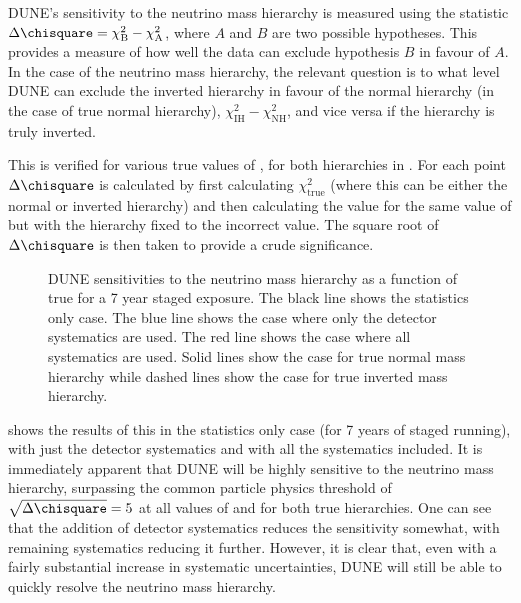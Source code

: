 DUNE's sensitivity to the neutrino mass hierarchy is measured using the statistic $\Delta \chisquare = \chi^{2}_{\text{B}} - \chi^{2}_{\text{A}}$, where $A$ and $B$ are two possible hypotheses.
This provides a measure of how well the data can exclude hypothesis $B$ in favour of $A$.
In the case of the neutrino mass hierarchy, the relevant question is to what level DUNE can exclude the inverted hierarchy in favour of the normal hierarchy (in the case of true normal hierarchy), $\chi^{2}_{\text{IH}} - \chi^{2}_{\text{NH}}$, and vice versa if the hierarchy is truly inverted.

This is verified for various true values of \dcp, for both hierarchies in .
For each \dcp point $\Delta \chisquare$ is calculated by first calculating $\chi^{2}_{\text{true}}$ (where this can be either the normal or inverted hierarchy) and then calculating the \chisquare value for the same value of \dcp but with the hierarchy fixed to the incorrect value.
The square root of $\Delta \chisquare$ is then taken to provide a crude significance.

\begin{figure}[h]
	\begin{adjustbox}{max totalsize=.6\linewidth, center}
		
	\end{adjustbox}
	\caption[DUNE sensitivity to the neutrino mass hierarchy as a function of true \dcp.]{DUNE sensitivities to the neutrino mass hierarchy as a function of true \dcp for a 7 year staged exposure. The black line shows the statistics only case. The blue line shows the case where only the detector systematics are used. The red line shows the case where all systematics are used. Solid lines show the case for true normal mass hierarchy while dashed lines show the case for true inverted mass hierarchy.}
	\label{fig:mhSens}
\end{figure}

 shows the results of this in the statistics only case (for 7 years of staged running), with just the detector systematics and with all the systematics included.
It is immediately apparent that DUNE will be highly sensitive to the neutrino mass hierarchy, surpassing the common particle physics threshold of $\sqrt{\Delta \chisquare} = 5$ at all values of \dcp and for both true hierarchies.
One can see that the addition of detector systematics reduces the sensitivity somewhat, with remaining systematics reducing it further.
However, it is clear that, even with a fairly substantial increase in systematic uncertainties, DUNE will still be able to quickly resolve the neutrino mass hierarchy.

